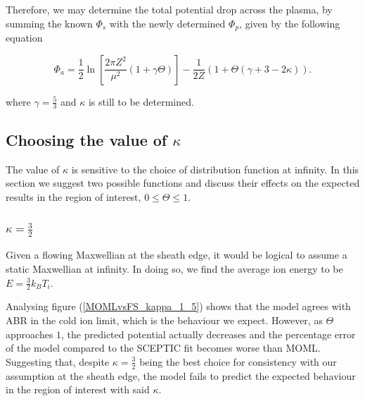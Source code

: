 \documentclass{article}
\begin{document}
\smallskip

Therefore, we may determine the total potential drop across the plasma, by summing the known
$\Phi_s$ with the newly determined $\Phi_p$, given by the following equation

\begin{equation}\label{eq:FSpotential}
\Phi_a =  \frac{1}{2}\ln{\left[\frac{2\pi Z^2}{\mu^2}(1 + \gamma \Theta)\right]} - \frac{1}{2Z}\left(1 + \Theta\left(\gamma + 3 -2\kappa\right)\right).
\end{equation}

\smallskip

\noindent where $\gamma = \frac{5}{3}$ and $\kappa$ is still to be determined.

\subsection{Choosing the value of $\kappa$}

\medskip

The value of $\kappa$ is sensitive to the choice of distribution function at infinity. In this
section we suggest two possible functions and discuss their effects on the expected results in the region of interest, 
$0 \leq \Theta \leq 1$.

\subsubsection{$\kappa = \frac{3}{2}$}

\medskip

Given a flowing Maxwellian at the sheath edge, it would be logical to assume a static Maxwellian at infinity.
In doing so, we find the average ion energy to be $E = \frac{3}{2}k_B T_i$.

\medskip

Analysing figure (\ref{MOMLvsFS_kappa_1_5}) shows that the model agrees with ABR in the cold ion limit, which is the behaviour we 
expect. However, as $\Theta$ approaches $1$, the predicted potential actually decreases and the percentage 
error of the model compared to the SCEPTIC fit becomes worse than MOML. Suggesting that, despite $\kappa = \frac{3}{2}$ being the best choice for consistency with our assumption
at the sheath edge, the model fails to predict the expected behaviour in the region of interest with said $\kappa$.
\end{document}
